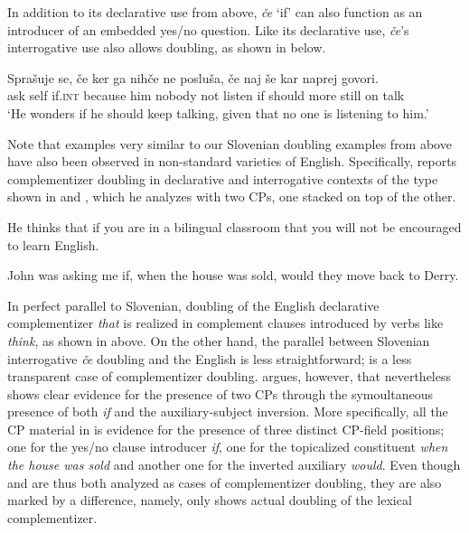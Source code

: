 \documentclass[output=paper,
]{langscibook}
\begin{document}
\noindent In addition to its declarative use from above, \textit{če} `if' can also function as an introducer of an embedded yes/no question. Like its declarative use, \textit{če}’s interrogative use also allows doubling, as shown in  below.

\begin{exe} 
\ex \label{ex:plesnicar:twentynine}
\gll Sprašuje se,	če	ker	ga	nihče		ne	posluša,	če	naj		še	kar	naprej	govori. \\
   ask  self 	if.\textsc{int} because him nobody	not	listen if should more	still	on	talk\\
\trans `He wonders if he should keep talking, given that no one is listening to him.'
\end{exe}

\noindent Note that examples very similar to our Slovenian doubling examples from above have also been observed in non-standard varieties of English. Specifically, \cite{mccloskey2006}  reports complementizer doubling in declarative and interrogative contexts of the type shown in  and , which he analyzes with two CPs, one stacked on top of the other. 

\ea \label{ex:plesnicar:thirty}
He thinks that if you are in a bilingual classroom that you will not be encouraged to learn English.
\hfill\citep[23,~(69b)]{mccloskey2006}
\z

\ea \label{ex:plesnicar:thirtyone}
John was asking me if, when the house was sold, would they move back to Derry.
\hfill\citep[24,~(72c)]{mccloskey2006}
\z

\noindent In perfect parallel to Slovenian, doubling of the English declarative complementizer \textit{that} is realized in complement clauses introduced by verbs like \textit{think}, as shown in  above. On the other hand, the parallel between Slovenian interrogative \textit{če} doubling and the English  is less straightforward;  is a less transparent case of complementizer doubling. \cite{mccloskey2006} argues, however,  that  nevertheless shows clear evidence for the presence of two CPs through the symoultaneous presence of both \textit{if} and the auxiliary-subject inversion. More specifically, all the CP material in  is evidence for the presence of three distinct CP-field positions; one for the yes/no clause introducer \textit{if}, one for the topicalized constituent \textit{when the house was sold} and another one for the inverted auxiliary \textit{would}. Even though  and  are thus both analyzed as cases of complementizer doubling, they are also marked by a difference, namely, only  shows actual doubling of the lexical complementizer.
\end{document}
